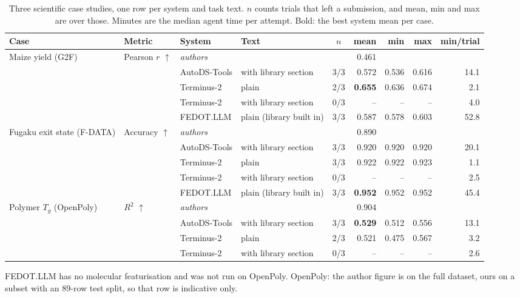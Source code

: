 \begin{table}[t]
\centering
\caption{Three scientific case studies, one row per system and task text. $n$ counts trials that left a submission, and mean, min and max are over those. Minutes are the median agent time per attempt. Bold: the best system mean per case.}
\label{tab:cases}
\small
\setlength{\tabcolsep}{5pt}
\begin{tabular}{llllcrrrr}
\toprule
Case & Metric & System & Text & $n$ & mean & min & max & min/trial \\
\midrule
Maize yield (G2F) & Pearson $r$ $\uparrow$ & \emph{authors} & & & 0.461 & & & \\
 & & AutoDS-Tools & with library section & 3/3 & 0.572 & 0.536 & 0.616 & 14.1 \\
 & & Terminus-2 & plain & 2/3 & \textbf{0.655} & 0.636 & 0.674 & 2.1 \\
 & & Terminus-2 & with library section & 0/3 & -- & -- & -- & 4.0 \\
 & & FEDOT.LLM & plain (library built in) & 3/3 & 0.587 & 0.578 & 0.603 & 52.8 \\
\midrule
Fugaku exit state (F-DATA) & Accuracy $\uparrow$ & \emph{authors} & & & 0.890 & & & \\
 & & AutoDS-Tools & with library section & 3/3 & 0.920 & 0.920 & 0.920 & 20.1 \\
 & & Terminus-2 & plain & 3/3 & 0.922 & 0.922 & 0.923 & 1.1 \\
 & & Terminus-2 & with library section & 0/3 & -- & -- & -- & 2.5 \\
 & & FEDOT.LLM & plain (library built in) & 3/3 & \textbf{0.952} & 0.952 & 0.952 & 45.4 \\
\midrule
Polymer $T_g$ (OpenPoly) & $R^2$ $\uparrow$ & \emph{authors} & & & 0.904 & & & \\
 & & AutoDS-Tools & with library section & 3/3 & \textbf{0.529} & 0.512 & 0.556 & 13.1 \\
 & & Terminus-2 & plain & 2/3 & 0.521 & 0.475 & 0.567 & 3.2 \\
 & & Terminus-2 & with library section & 0/3 & -- & -- & -- & 2.6 \\
\bottomrule
\end{tabular}
\begin{tablenotes}\footnotesize
\item FEDOT.LLM has no molecular featurisation and was not run on OpenPoly. OpenPoly: the author figure is on the full dataset, ours on a subset with an 89-row test split, so that row is indicative only.
\end{tablenotes}
\end{table}
